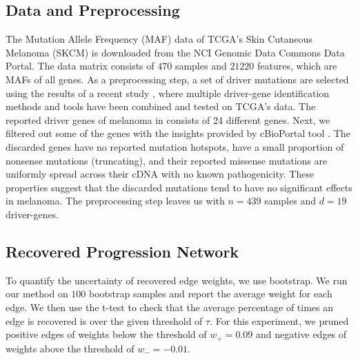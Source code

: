 \documentclass{bmcart}
\begin{document}


\subsection{Data and Preprocessing}
The Mutation Allele Frequency (MAF) data of TCGA's Skin Cutaneous Melanoma (SKCM) is downloaded from the NCI Genomic Data Commons Data Portal. The data matrix consists of $470$ samples and $21220$ features, which are MAFs of all genes. As a preprocessing step, a set of driver mutations are selected using the results of a recent study \cite{bailey2018comprehensive}, where multiple driver-gene identification methods and tools have been combined and tested on TCGA's data. The reported driver genes of melanoma in \cite{bailey2018comprehensive} consists of 24 different genes. Next, we filtered out some of the genes with the insights provided by cBioPortal tool \cite{cerami2012cbio, gao2013integrative}. The discarded genes have no reported mutation hotspots, have a small proportion of nonsense mutations (truncating), and their reported missense mutations are uniformly spread across their cDNA with no known pathogenicity. These properties suggest that the discarded mutations tend to have no significant effects in melanoma. The preprocessing step leaves us with $n = 439$ samples and $d = 19$ driver-genes.

\subsection{Recovered Progression Network}
To quantify the uncertainty of recovered edge weights, we use bootstrap. We run our method on $100$ bootstrap samples and report the average weight for each edge. We then use the t-test to check that the average percentage of times an edge is recovered is over the given threshold of $\tau$. For this experiment, we pruned positive edges of weights below the threshold of $w_+ = 0.09$ and negative edges of weights above the threshold of $w_- = -0.01$.
\end{document}
